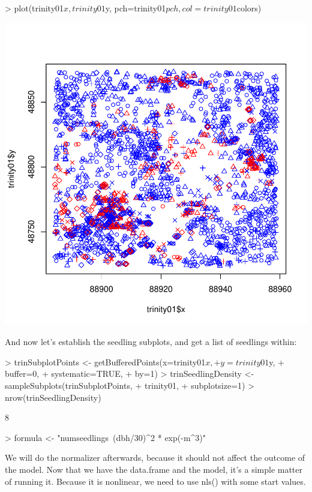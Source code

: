 \documentclass{article}
\begin{document}
\begin{Schunk}
\begin{Sinput}
> plot(trinity01$x, trinity01$y, pch=trinity01$pch, col=trinity01$colors)
\end{Sinput}
\end{Schunk}
\includegraphics{disperseRmanual-009}


And now let's establish the seedling subplots, and get a list of seedlings within:

\begin{Schunk}
\begin{Sinput}
> trinSubplotPoints <- getBufferedPoints(x=trinity01$x,
+                   y=trinity01$y,
+                   buffer=0,
+                   systematic=TRUE,
+                   by=1)
> trinSeedlingDensity <- sampleSubplots(trinSubplotPoints,
+                                       trinity01,
+                                       subplotsize=1)
> nrow(trinSeedlingDensity)
\end{Sinput}
\begin{Soutput}
[1] 8
\end{Soutput}
\end{Schunk}


\begin{Schunk}
\begin{Sinput}
> formula <- "numseedlings~(dbh/30)^2 * exp(-m^3)"
\end{Sinput}
\end{Schunk}

We will do the normalizer afterwards, because it should not affect the outcome of the model. Now that we have the data.frame and the model, it's a simple matter of running it. Because it is nonlinear, we need to use nls() with some start values.




\end{document}
